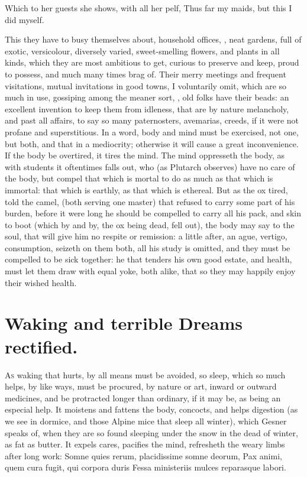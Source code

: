 {Which to her guests she shows, with all her pelf,
Thus far my maids, but this I did myself.

This they have to busy themselves about, household offices, \etc{}, 
neat gardens, full of exotic, versicolour, diversely varied,
sweet-smelling flowers, and plants in all kinds, which they are most
ambitious to get, curious to preserve and keep, proud to possess, and
much many times brag of. Their merry meetings and frequent visitations,
mutual invitations in good towns, I voluntarily omit, which are so much
in use, gossiping among the meaner sort, \etc{}, old folks have their
beads: an excellent invention to keep them from idleness, that are by
nature melancholy, and past all affairs, to say so many paternosters,
avemarias, creeds, if it were not profane and superstitious. In a word,
body and mind must be exercised, not one, but both, and that in a
mediocrity; otherwise it will cause a great inconvenience. If the body
be overtired, it tires the mind. The mind oppresseth the body, as with
students it oftentimes falls out, who (as Plutarch observes) have
no care of the body, but compel that which is mortal to do as much as
that which is immortal: that which is earthly, as that which is
ethereal. But as the ox tired, told the camel, (both serving one
master) that refused to carry some part of his burden, before it were
long he should be compelled to carry all his pack, and skin to boot
(which by and by, the ox being dead, fell out), the body may say to the
soul, that will give him no respite or remission: a little after, an
ague, vertigo, consumption, seizeth on them both, all his study is
omitted, and they must be compelled to be sick together: he that
tenders his own good estate, and health, must let them draw with equal
yoke, both alike,  that so they may happily enjoy their wished
health.


\section{Waking and terrible Dreams rectified.}

\lettrine{A}{s} waking that hurts, by all means must be avoided, so sleep, which so
much helps, by like ways, must be procured, by nature or art,
inward or outward medicines, and be protracted longer than ordinary, if
it may be, as being an especial help. It moistens and fattens the body,
concocts, and helps digestion (as we see in dormice, and those Alpine
mice that sleep all winter), which Gesner speaks of, when they are so
found sleeping under the snow in the dead of winter, as fat as butter.
It expels cares, pacifies the mind, refresheth the weary limbs after
long work:
Somne quies rerum, placidissime somne deorum, Pax animi, quem
cura fugit, qui corpora duris
Fessa ministeriis mulces reparasque labori.

}
